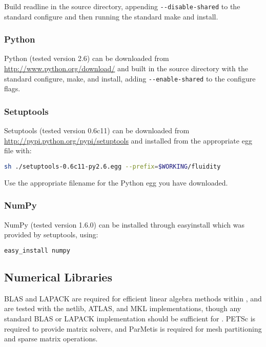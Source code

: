 Build readline in the source directory, appending
\lstinline[language=bash]+--disable-shared+ to the standard configure and then
running the standard make and install.

\subsubsection{Python}
\label{sec:required_libraries_python_python}

Python (tested version 2.6) can be downloaded from
\url{http://www.python.org/download/} and built in the source directory with
the standard configure, make, and install, adding
\lstinline[language=bash]+--enable-shared+ to the configure flags.

\subsubsection{Setuptools}
\label{sec:required_libraries_python_setuptools}

Setuptools (tested version 0.6c11) can be downloaded from
\url{http://pypi.python.org/pypi/setuptools} and installed from the appropriate
egg file with:

\begin{lstlisting}[language=bash]
sh ./setuptools-0.6c11-py2.6.egg --prefix=$WORKING/fluidity
\end{lstlisting}

Use the appropriate filename for the Python egg you have downloaded.

\subsubsection{NumPy}
\label{sec:required_libraries_python_numpy}

NumPy (tested version 1.6.0) can be installed through
easy{\textunderscore}install which was provided by setuptools, using:

\begin{lstlisting}[language=bash]
easy_install numpy
\end{lstlisting}

\subsection{Numerical Libraries}
\label{sec:required_libraries_numerical}

BLAS and LAPACK are required for efficient linear algebra methods within
\fluidity, and are tested with the netlib, ATLAS, and MKL implementations, though
any standard BLAS or LAPACK implementation should be sufficient for \fluidity.
PETSc is required to provide matrix solvers, and ParMetis is required for mesh
partitioning and sparse matrix operations.

